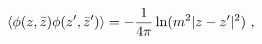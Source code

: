 \begin{equation}\label{2.13}
\langle \phi(z,\bar{z}) \phi(z',\bar{z}') \rangle=
-{1 \over 4\pi}\ln (m^2 |z-z'|^2)~,
\end{equation}

